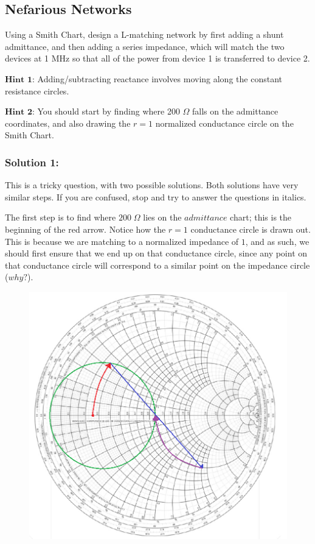 \documentclass{article}
\begin{document}
\subsection{Nefarious Networks}
Using a Smith Chart, design a L-matching network by first adding a shunt admittance, and then adding a series impedance, which will match the two devices at 1 MHz so that all of the power from device 1 is transferred to device 2. 
\vspace{3mm}

$\textbf{Hint 1:}$ Adding/subtracting reactance involves moving along the constant resistance circles.


\vspace{3mm}

$\textbf{Hint 2:}$ You should start by finding where 200 $\Omega$ falls on the admittance coordinates, and also drawing the $r = 1$ normalized conductance circle on the Smith Chart.

\subsubsection{Solution 1:}

This is a tricky question, with two possible solutions. Both solutions have very similar steps. If you are confused, stop and try to answer the questions in italics.

\vspace{3mm}

The first step is to find where $200 \;\Omega$ lies on the $admittance$ chart; this is the beginning of the red arrow. Notice how the $r=1$ conductance circle is drawn out. This is because we are matching to a normalized impedance of $1$, and as such, we should first ensure that we end up on that conductance circle, since any point on that conductance circle will correspond to a similar point on the impedance circle ($why?$). 

\begin{figure}[ht!]
\begin{center}
    \includegraphics[width=0.7\linewidth]{figures/smith.png}
\end{center}
\end{figure}
\end{document}
